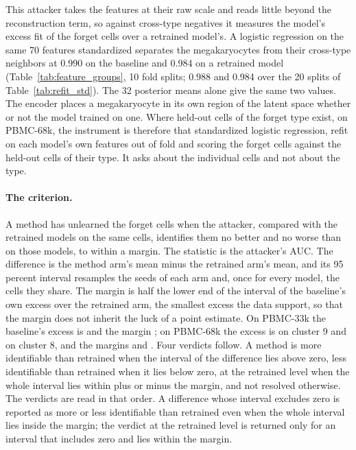 \documentclass{article}
\begin{document}
This attacker takes the features at their raw scale and reads little beyond the reconstruction term, so against cross-type negatives it measures the model's excess fit of the forget cells over a retrained model's. A logistic regression on the same 70 features standardized separates the megakaryocytes from their cross-type neighbors at 0.990 on the baseline and 0.984 on a retrained model (Table~\ref{tab:feature_groups}, 10 fold splits; 0.988 and 0.984 over the 20 splits of Table~\ref{tab:refit_std}). The 32 posterior means alone give the same two values. The encoder places a megakaryocyte in its own region of the latent space whether or not the model trained on one. Where held-out cells of the forget type exist, on PBMC-68k, the instrument is therefore that standardized logistic regression, refit on each model's own features out of fold and scoring the forget cells against the held-out cells of their type. It asks about the individual cells and not about the type.

\paragraph{The criterion.} A method has unlearned the forget cells when the attacker, compared with the retrained models on the same cells, identifies them no better and no worse than on those models, to within a margin. The statistic is the attacker's AUC. The difference is the method arm's mean minus the retrained arm's mean, and its 95 percent interval resamples the seeds of each arm and, once for every model, the cells they share. The margin is half the lower end of the interval of the baseline's own excess over the retrained arm, the smallest excess the data support, so that the margin does not inherit the luck of a point estimate. On PBMC-33k the baseline's excess is  and the margin ; on PBMC-68k the excess is  on cluster 9 and  on cluster 8, and the margins  and . Four verdicts follow. A method is more identifiable than retrained when the interval of the difference lies above zero, less identifiable than retrained when it lies below zero, at the retrained level when the whole interval lies within plus or minus the margin, and not resolved otherwise. The verdicts are read in that order. A difference whose interval excludes zero is reported as more or less identifiable than retrained even when the whole interval lies inside the margin; the verdict at the retrained level is returned only for an interval that includes zero and lies within the margin.
\end{document}
